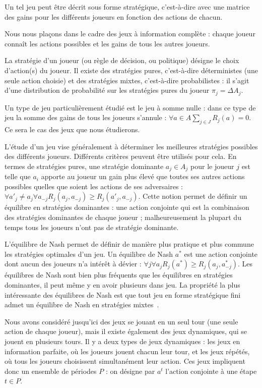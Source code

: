 \documentclass{article}
\begin{document}
Un tel jeu peut être décrit sous forme stratégique, c'est-à-dire avec une matrice des gains pour les différents joueurs en fonction des actions de chacun.

Nous nous plaçons dans le cadre des jeux à information complète : chaque joueur connaît les actions possibles et les gains de tous les autres joueurs.

La stratégie d'un joueur (ou règle de décision, ou politique) désigne le choix d'action(s) du joueur. Il existe des stratégies pures, c'est-à-dire déterministes (une seule action choisie) et des stratégies mixtes, c'est-à-dire probabilistes : il s'agit d'une distribution de probabilité sur les stratégies pures du joueur \(\pi_j = \Delta A_j\).

Un type de jeu particulièrement étudié est le jeu à somme nulle : dans ce type de jeu la somme des gains de tous les joueurs s'annule : \(\forall a \in A \sum\limits_{j \in J} R_j(a) = 0\). Ce sera le cas des jeux que nous étudierons.

L'étude d'un jeu vise généralement à déterminer les meilleures stratégies possibles des différents joueurs. Différents critères peuvent être utilisés pour cela. En termes de stratégies pures, une stratégie dominante \(a_j \in A_j\) pour le joueur \(j\) est telle que \(a_i\) apporte au joueur un gain plus élevé que toutes ses autres actions possibles quelles que soient les actions de ses adversaires : \(\forall a'_j \neq a_j \forall a_{-j} R_j(a_j, a_{-j}) \geq R_j(a'_j, a_{-j})\). Cette notion permet de définir un équilibre en stratégies dominantes : une action conjointe qui est la combinaison des stratégies dominantes de chaque joueur ; malheureusement la plupart du temps tous les joueurs n'ont pas de stratégie dominante.

L'équilibre de Nash permet de définir de manière plus pratique et plus commune les stratégies optimales d'un jeu. Un équilibre de Nash \(a^{*}\) est une action conjointe dont aucun des joueurs n'a intérêt à dévier : \(\forall j \forall a_j R_j(a^{*}) \geq R_j(a_j, a^{*}_{-j})\). Les équilibres de Nash sont bien plus fréquents que les équilibres en stratégies dominantes, il peut même y en avoir plusieurs dans jeu. La propriété la plus intéressante des équilibres de Nash est que tout jeu en forme stratégique fini admet un équilibre de Nash en stratégies mixtes~\cite{pdmia}. 

Nous avons considéré jusqu'ici des jeux se jouant en un seul tour (une seule action de chaque joueur), mais il existe également des jeux dynamiques, qui se jouent en plusieurs tours. Il y a deux types de jeux dynamiques : les jeux en information parfaite, où les joueurs jouent chacun leur tour, et les jeux répétés, où tous les joueurs  choisissent simultanément leur action. Ces jeux impliquent donc un ensemble de périodes \(P\) : on désigne par \(a^t\) l'action conjointe à une étape \(t \in P\).
\end{document}
